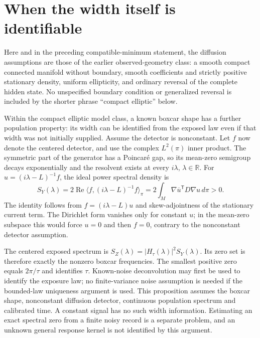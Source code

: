 \section{When the width itself is identifiable}

Here and in the preceding compatible-minimum statement, the diffusion
assumptions are those of the earlier observed-geometry class: a smooth compact
connected manifold without boundary, smooth coefficients and strictly positive
stationary density, uniform ellipticity, and ordinary reversal of the complete
hidden state. No unspecified boundary condition or generalized reversal is
included by the shorter phrase ``compact elliptic'' below.

Within the compact elliptic model class, a known boxcar shape has a further
population property: its width can be identified from the exposed law even
if that width was not initially supplied. Assume the detector is nonconstant.
Let $f$ now denote the centered detector, and use the complex
$L^2(\pi)$ inner product. The symmetric part of the generator has a
Poincar\'e gap, so its mean-zero semigroup decays exponentially and the
resolvent exists at every $i\lambda$, $\lambda\in\mathbb R$.
For $u=(i\lambda-L)^{-1}f$, the ideal power spectral density is
\begin{equation}
 S_Y(\lambda)
 =2\operatorname{Re}\langle f,(i\lambda-L)^{-1}f\rangle_\pi
 =2\int_M\nabla\overline u^{\mathsf T}D\nabla u\,d\pi
 >0.
 \label{eq:dg-positive-spectrum}
\end{equation}
The identity follows from $f=(i\lambda-L)u$ and skew-adjointness of the
stationary current term. The Dirichlet form vanishes only for constant $u$;
in the mean-zero subspace this would force $u=0$ and then $f=0$, contrary
to the nonconstant detector assumption.

The centered exposed spectrum is
$S_Z(\lambda)=|H_\tau(\lambda)|^2S_Y(\lambda)$. Its zero set is
therefore exactly the nonzero boxcar frequencies. The smallest positive
zero equals $2\pi/\tau$ and identifies $\tau$. Known-noise deconvolution
may first be used to identify the exposure law; no finite-variance noise
assumption is needed if the bounded-law uniqueness argument is used.
This proposition assumes the boxcar shape, nonconstant diffusion detector,
continuous population spectrum and calibrated time. A constant signal has
no such width information. Estimating an exact spectral zero from a finite
noisy record is a separate problem, and an unknown general response kernel
is not identified by this argument.

